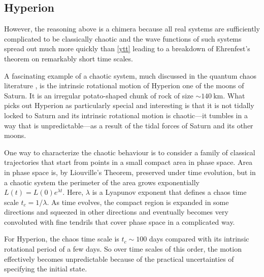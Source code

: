 \documentclass[12pt]{article}
\theoremstyle{plain}
\theoremstyle{definition}
\theoremstyle{remark}
\begin{document}
\subsection{Hyperion}\label{s3.1}

However, the reasoning above is a chimera because all real systems are sufficiently complicated to be classically chaotic and the wave functions of such systems spread out much more quickly than \eqref{ytt} leading to a breakdown of Ehrenfest's theorem on remarkably short time scales.

A fascinating example of a chaotic system, much discussed in the quantum chaos literature \cite{Zurek1,Zurek2,Berry,Sch1}, is the intrinsic rotational motion of Hyperion one of the moons of Saturn.
It is an irregular potato-shaped chunk of rock of size $\sim140\ \text{km}$. What picks out Hyperion as particularly special and interesting is that it is not tidally locked to Saturn and its intrinsic rotational motion is chaotic---it tumbles in a way that is unpredictable---as a result of the tidal forces of Saturn and its other moons.

One way to characterize the chaotic behaviour is to consider a family of classical trajectories that start from points in a small compact area in phase space. Area in phase space is, by Liouville's Theorem, preserved under time evolution, but in a chaotic system the perimeter of the area grows exponentially $L(t)=L(0)e^{\lambda t}$. Here, $\lambda$ is a Lyapunov exponent that defines a chaos time scale $t_c=1/\lambda$. As time evolves, the compact region is expanded in some directions and squeezed in other directions and eventually becomes very convoluted with fine tendrils that cover phase space in a complicated way.

For Hyperion, the chaos time scale is $t_c\sim100$ days compared with its intrinsic rotational period of a few days. So over time scales of this order, the motion effectively becomes unpredictable because of the practical uncertainties of specifying the initial state.
\end{document}
